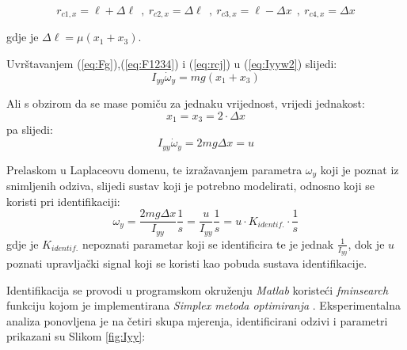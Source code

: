 \documentclass[11pt,a4paper]{article}
\begin{document}
\begin{equation}
r_{c1,x} = \ell + \Delta \ell \  \  , \ r_{c2,x} = \Delta \ell \  \ , \  r_{c3,x} = \ell - \Delta x \  \ , \  r_{c4,x} =  \Delta x
\label{eq:rcj}
\end{equation}

gdje je $\Delta \ell = \mu(x_{1}  + x_{3})$.

Uvrštavanjem (\ref{eq:Fg}),(\ref{eq:F1234}) i (\ref{eq:rcj}) u (\ref{eq:Iyyw2}) slijedi:
\begin{equation}
 I_{yy}\dot{\omega}_{y} = mg(x_{1} + x_{3})
 \label{eq:Iyyw3}
 \end{equation} 
 
 Ali s obzirom da se mase pomiču za jednaku vrijednost, vrijedi jednakost:
 \begin{equation}
 x_{1} = x_{3} = 2\cdot\Delta x
 \label{eq:x1xx3}
 \end{equation}
pa slijedi:
\begin{equation}
I_{yy} \dot{\omega}_{y} = 2mg\Delta x = u
\label{eq:upr}
\end{equation}

Prelaskom u Laplaceovu domenu, te izražavanjem parametra $\omega_{y}$ koji je poznat iz snimljenih odziva, slijedi sustav koji je potrebno modelirati, odnosno koji se koristi pri identifikaciji:
\begin{equation}
\omega_{y} = \frac{2mg \Delta x}{I_{yy}} \frac{1}{s} = \frac{u}{I_{yy}} \frac{1}{s} = u \cdot K_{identif.} \cdot \frac{1}{s}
\label{eq:wy}
\end{equation}
\medskip
gdje je $K_{identif.}$ nepoznati parametar koji se identificira te je jednak $\frac{1}{I_{yy}}$, dok je $u$ poznati upravljački signal koji se koristi kao pobuda sustava identifikacije.

Identifikacija se provodi u programskom okruženju \textit{Matlab} koristeći \textit{fminsearch} funkciju kojom je implementirana \textit{Simplex metoda optimiranja} \cite{fmin}. Eksperimentalna analiza ponovljena je na četiri skupa mjerenja, identificirani odzivi i parametri prikazani su Slikom \ref{fig:Iyy}:  
    
\end{document}
